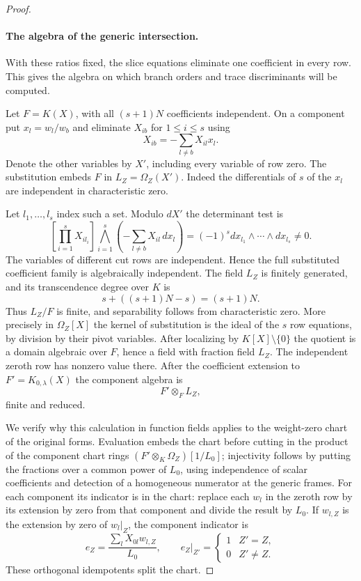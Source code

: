 \begin{proof}
\paragraph{The algebra of the generic intersection.}

With these ratios fixed, the slice equations eliminate one coefficient in every row. This gives the algebra on which branch orders and trace discriminants will be computed.

Let \(F=K(X)\), with all \((s+1)N\) coefficients independent.
On a component put \(x_l=w_l/w_b\) and eliminate \(X_{ib}\) for
\(1\le i\le s\) using 
\[
  X_{ib}=-\sum_{l\ne b}X_{il}x_l.
\]
Denote the other variables by \(X'\), including every variable of
row zero. The substitution embeds \(F\) in \(L_Z=\Omega_Z(X')\).
Indeed the differentials of \(s\) of the \(x_l\) are independent
in characteristic zero.

Let \(l_1,\dots,l_s\) index such a set. Modulo \(dX'\) the
determinant test is
\[
 \left[\prod_{i=1}^s X_{i l_i}\right]
      \bigwedge_{i=1}^s\!\left(-\sum_{l\ne b}X_{il}\,dx_l\right)
       =(-1)^s dx_{l_1}\wedge\cdots\wedge dx_{l_s}\ne0 .
\]
The variables of different cut rows are independent. Hence the
full substituted coefficient family is algebraically independent.
The field \(L_Z\) is finitely generated, and its transcendence
degree over \(K\) is 
\[
  s+((s+1)N-s)=(s+1)N.
\]
 Thus \(L_Z/F\)
is finite, and separability follows from characteristic zero.
More precisely in \(\Omega_Z[X]\) the kernel of substitution is
the ideal of the \(s\) row equations, by division by their pivot
variables. After localizing by \(K[X]\setminus\{0\}\) the quotient
is a domain algebraic over \(F\), hence a field with fraction field
\(L_Z\). The independent zeroth row has nonzero value there.
After the coefficient extension to \(F'=K_{0,\lambda}(X)\) the
component algebra is 
\[
  F'\otimes_F L_Z,
\]
 finite and reduced.

We verify why this calculation in function fields applies to the
weight-zero chart of the original forms. Evaluation embeds the chart
before cutting in the product of the component chart rings
\((F'\otimes_K\Omega_Z)[1/L_0]\); injectivity follows by putting
the fractions over a common power of \(L_0\), using independence
of scalar coefficients and detection of a homogeneous numerator at
the generic frames. For each component its indicator is in the chart:
replace each \(w_l\) in the zeroth row by its extension by zero from
that component and divide the result by \(L_0\).
If \(w_{l,Z}\) is the extension by zero of \(w_l|_Z\), the component indicator is
\[
  e_Z=\frac{\sum_lX_{0l}w_{l,Z}}{L_0},\qquad e_Z|_{Z'}=\begin{cases}1&Z'=Z,\\0&Z'\ne Z.\end{cases}
\]
 These orthogonal
idempotents split the chart.


\end{proof}

